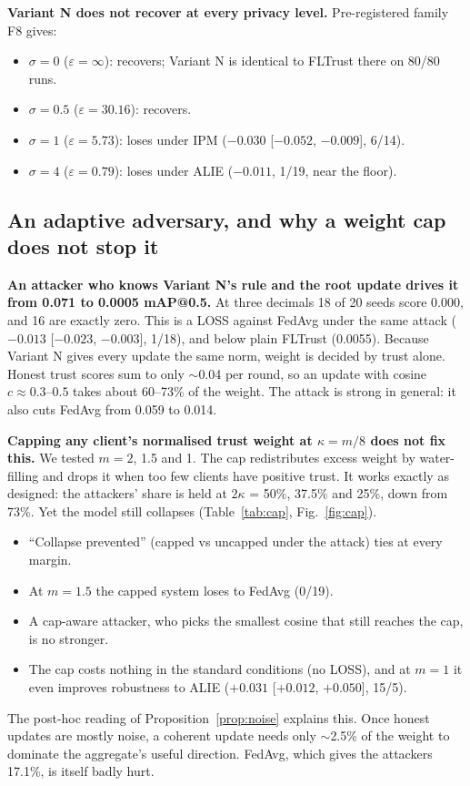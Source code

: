 \documentclass[journal]{IEEEtran}
\makeatletter
\newcommand{\eps}{\varepsilon}
\newcommand{\mAP}{mAP@0.5}
\makeatother
\begin{document}
\textbf{Variant N does not recover at every privacy level.} Pre-registered family F8 gives:
\begin{itemize}
  \item $\sigma = 0$ ($\eps=\infty$): recovers; Variant N is identical to FLTrust there on 80/80 runs.
  \item $\sigma = 0.5$ ($\eps = 30.16$): recovers.
  \item $\sigma = 1$ ($\eps = 5.73$): loses under IPM ($-0.030$ [$-0.052$, $-0.009$], 6/14).
  \item $\sigma = 4$ ($\eps = 0.79$): loses under ALIE ($-0.011$, 1/19, near the floor).
\end{itemize}

\subsection{An adaptive adversary, and why a weight cap does not stop it}
\label{sec:res-adaptive}
\textbf{An attacker who knows Variant N's rule and the root update drives it from 0.071 to 0.0005
\mAP{}.} At three decimals 18 of 20 seeds score 0.000, and 16 are exactly zero. This is a LOSS
against FedAvg under the same attack ($-0.013$ [$-0.023$, $-0.003$], 1/18), and below plain FLTrust
(0.0055). Because Variant N gives every update the same norm, weight is decided by trust alone. Honest
trust scores sum to only $\sim$0.04 per round, so an update with cosine $c \approx 0.3$--$0.5$ takes
about 60--73\% of the weight. The attack is strong in general: it also cuts FedAvg from 0.059 to
0.014.

\textbf{Capping any client's normalised trust weight at $\kappa = m/8$ does not fix this.} We tested
$m = 2$, 1.5 and 1. The cap redistributes excess weight by water-filling and drops it when too few
clients have positive trust. It works exactly as designed: the attackers' share is held at
$2\kappa$ = 50\%, 37.5\% and 25\%, down from 73\%. Yet the model still collapses
(Table~\ref{tab:cap}, Fig.~\ref{fig:cap}).
\begin{itemize}
  \item ``Collapse prevented'' (capped vs uncapped under the attack) ties at every margin.
  \item At $m = 1.5$ the capped system loses to FedAvg (0/19).
  \item A cap-aware attacker, who picks the smallest cosine that still reaches the cap, is no stronger.
  \item The cap costs nothing in the standard conditions (no LOSS), and at $m = 1$ it even improves
  robustness to ALIE ($+0.031$ [$+0.012$, $+0.050$], 15/5).
\end{itemize}
The post-hoc reading of Proposition~\ref{prop:noise} explains this. Once honest updates are mostly
noise, a coherent update needs only $\sim$2.5\% of the weight to dominate the aggregate's useful
direction. FedAvg, which gives the attackers 17.1\%, is itself badly hurt.
\end{document}
